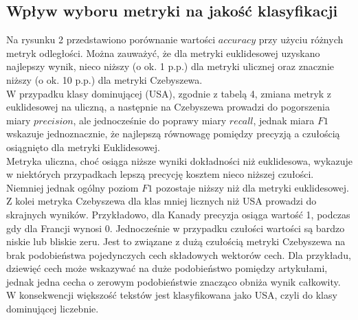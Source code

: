 \documentclass{article}
\begin{document}
\subsection{Wpływ wyboru metryki na jakość klasyfikacji}
Na rysunku 2 przedstawiono porównanie wartości \(accuracy\) przy użyciu różnych metryk odległości. Można zauważyć, że dla metryki euklidesowej uzyskano najlepszy wynik, nieco niższy (o ok. 1 p.p.) dla metryki ulicznej oraz znacznie niższy (o ok. 10 p.p.) dla metryki Czebyszewa.\\
W przypadku klasy dominującej (USA), zgodnie z tabelą 4, zmiana metryk z euklidesowej na uliczną, a następnie na Czebyszewa prowadzi do pogorszenia miary \(precision\), ale jednocześnie do poprawy miary \(recall\), jednak miara \(F1\) wskazuje jednoznacznie, że najlepszą równowagę pomiędzy precyzją a czułością osiągnięto dla metryki Euklidesowej. \\
Metryka uliczna, choć osiąga niższe wyniki dokładności niż euklidesowa, wykazuje w niektórych przypadkach lepszą precycję kosztem nieco niższej czułości. Niemniej jednak ogólny poziom \(F1\) pozostaje niższy niż dla metryki euklidesowej. \\
Z kolei metryka Czebyszewa dla klas mniej licznych niż USA prowadzi do skrajnych wyników. Przykładowo, dla Kanady precyzja osiąga wartość 1, podczas gdy dla Francji wynosi 0. Jednocześnie w przypadku czułości wartości są bardzo niskie lub bliskie zeru. Jest to związane z dużą czułością metryki Czebyszewa na brak podobieństwa pojedynczych cech składowych wektorów cech. Dla przykładu, dziewięć cech może wskazywać na duże podobieństwo pomiędzy artykułami, jednak jedna cecha o zerowym podobieństwie znacząco obniża wynik całkowity. W konsekwencji większość tekstów jest klasyfikowana jako USA, czyli do klasy dominującej liczebnie.
\end{document}
